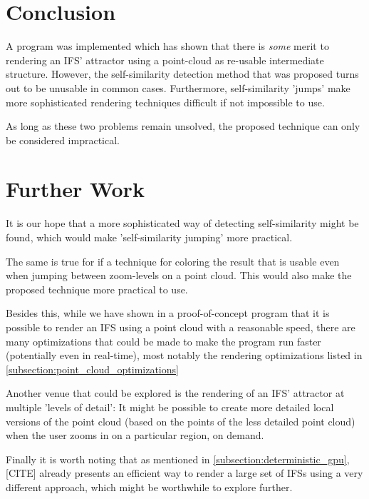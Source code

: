 \documentclass[11pt]{article}
\begin{document}
\section{Conclusion}
\label{sec:org03541c9}

A program was implemented which has shown that there is \emph{some} merit to rendering an IFS' attractor using a point-cloud as re-usable intermediate structure.
However, the self-similarity detection method that was proposed turns out to be unusable in common cases.
Furthermore, self-similarity 'jumps' make more sophisticated rendering techniques difficult if not impossible to use.

As long as these two problems remain unsolved, the proposed technique can only be considered impractical.

\section{Further Work}
\label{sec:org7e5c291}

It is our hope that a more sophisticated way of detecting self-similarity might be found,
which would make 'self-similarity jumping' more practical.

The same is true for if a technique for coloring the result that is usable even when jumping between zoom-levels on a point cloud.
This would also make the proposed technique more practical to use.

Besides this, while we have shown in a proof-of-concept program that it is possible to render an IFS using a point cloud
with a reasonable speed, there are many optimizations that could be made to make the program run faster (potentially even in real-time),
most notably the rendering optimizations listed in \autoref{subsection:point_cloud_optimizations}

Another venue that could be explored is the rendering of an IFS' attractor at multiple 'levels of detail':
It might be possible to create more detailed local versions of the point cloud (based on the points of the less detailed point cloud) when the user
zooms in on a particular region, on demand.

Finally it is worth noting that as mentioned in \autoref{subsection:deterministic_gpu}, [CITE] already presents an efficient way to render a large set of IFSs using a very different approach, 
which might be worthwhile to explore further.
\end{document}
